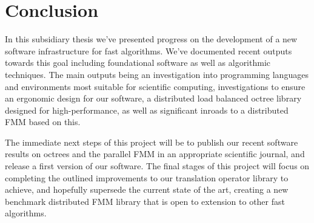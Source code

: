 \chapter{Conclusion}\label{chpt:conclusion}

In this subsidiary thesis we've presented progress on the development of a new software infrastructure for fast algorithms. We've documented recent outputs towards this goal including foundational software as well as algorithmic techniques. The main outputs being an investigation into programming languages and environments most suitable for scientific computing, investigations to ensure an ergonomic design for our software, a distributed load balanced octree library designed for high-performance, as well as significant inroads to a distributed FMM based on this.

The immediate next steps of this project will be to publish our recent software results on octrees and the parallel FMM in an appropriate scientific journal, and release a first version of our software. The final stages of this project will focus on completing the outlined improvements to our translation operator library to achieve, and hopefully supersede the current state of the art, creating a new benchmark distributed FMM library that is open to extension to other fast algorithms.